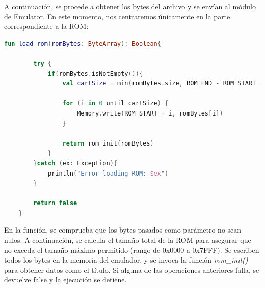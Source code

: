 A continuación, se procede a obtener los bytes del archivo y se envían al módulo de Emulator. En este momento, nos centraremos únicamente en la parte correspondiente a la ROM:

\begin{lstlisting}[language=Kotlin, caption={Carga de ROM y manejo de errores durante el proceso.}, label={code:kotlinloadrom}]
    fun load_rom(romBytes: ByteArray): Boolean{

        try {
            if(romBytes.isNotEmpty()){
                val cartSize = min(romBytes.size, ROM_END - ROM_START + 1)

                for (i in 0 until cartSize) {
                    Memory.write(ROM_START + i, romBytes[i])
                }

                return rom_init(romBytes)
            }
        }catch (ex: Exception){
            println("Error loading ROM: $ex")
        }

        return false
    }
\end{lstlisting}

En la función, se comprueba que los bytes pasados como parámetro no sean nulos. A continuación, se calcula el tamaño total de la ROM para asegurar que no exceda el tamaño máximo permitido (rango de 0x0000 a 0x7FFF). Se escriben todos los bytes en la memoria del emulador, y se invoca la función \textit{rom\_init()} para obtener datos como el título. Si alguna de las operaciones anteriores falla, se devuelve false y la ejecución se detiene.

